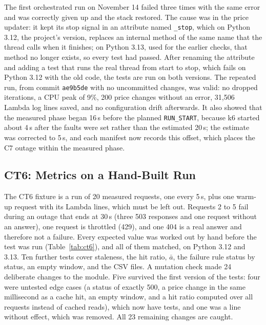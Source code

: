 \documentclass[10pt]{article}
\begin{document}
The first orchestrated run on November 14 failed three times with the same
error and was correctly given up and the stack restored. The cause was in the
price updater: it kept its stop signal in an attribute named \texttt{\_stop},
which on Python 3.12, the project's version, replaces an internal method of
the same name that the thread calls when it finishes; on Python 3.13, used for
the earlier checks, that method no longer exists, so every test had passed.
After renaming the attribute and adding a test that runs the real thread from
start to stop, which fails on Python 3.12 with the old code, the tests are run
on both versions. The repeated run, from commit \texttt{ae9b5de} with no
uncommitted changes, was valid: no dropped iterations, a CPU peak of 9\%, 200
price changes without an error, 31{,}506 Lambda log lines saved, and no
configuration drift afterwards. It also showed that the measured phase began
16\,s before the planned \texttt{RUN\_START}, because k6 started about 4\,s
after the faults were set rather than the estimated 20\,s; the estimate was
corrected to 5\,s, and each manifest now records this offset, which places
the C7 outage within the measured phase.

\subsection{CT6: Metrics on a Hand-Built Run}
The CT6 fixture is a run of 20 measured requests, one every 5\,s, plus one
warm-up request with its Lambda lines, which must be left out. Requests 2 to 5
fail during an outage that ends at 30\,s (three 503 responses and one request
without an answer), one request is throttled (429), and one 404 is a real
answer and therefore not a failure. Every expected value was worked out by hand
before the test was run (Table~\ref{tab:ct6}), and all of them matched, on
Python 3.12 and 3.13. Ten further tests cover staleness, the hit ratio,
$\bar{a}$, the failure rule status by status, an empty window, and the CSV
files. A mutation check made 24 deliberate changes to the module. Five
survived the first version of the tests: four were untested edge cases (a
status of exactly 500, a price change in the same millisecond as a cache hit,
an empty window, and a hit ratio computed over all requests instead of cached
reads), which now have tests, and one was a line without effect, which was
removed. All 23 remaining changes are caught.
\end{document}
